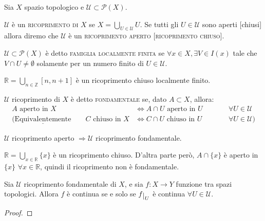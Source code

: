 Sia $X$ spazio topologico e $\mathcal{U} \subset \mathcal{P}(X)$.

\begin{defn}
$\mathcal{U}$ è un \textsc{ricoprimento di $X$} se $X=\bigcup _{U \in \mathcal{U}}U$. Se tutti gli $U \in \mathcal{U}$ sono aperti [chiusi] allora diremo che $\mathcal{U}$ è un \textsc{ricoprimento aperto [ricoprimento chiuso]}.
\end{defn}

\begin{defn}
$\mathcal{U} \subset \mathcal{P}(X)$ è detto \textsc{famiglia localmente finita} se $\forall x \in X, \exists V \in I(x)$ tale che $V \cap U \neq \emptyset$ solamente per un numero finito di $U \in \mathcal{U}$.
\end{defn}

\begin{ex}
$\mathbb{R}=\bigcup _{n \in \mathbb{Z}}[n,n+1]$ è un ricoprimento chiuso localmente finito.
\end{ex}

\begin{defn}
$\mathcal{U}$ ricoprimento di $X$ è detto \textsc{fondamentale} se, dato $A \subset X$, allora:
\begin{align*}
A \text{ aperto in }X &\Longleftrightarrow A \cap U \text{ aperto in }U \qquad &&\forall U \in \mathcal{U} \\
(\underline{\text{Equivalentemente}} \qquad C \text{ chiuso in }X &\Longleftrightarrow C \cap U \text{ chiuso in }U \qquad &&\forall U \in \mathcal{U})
\end{align*}
\end{defn}

\begin{ex}
\begin{nlist}
\item $\mathcal{U}$ ricoprimento aperto $\Longrightarrow \mathcal{U}$ ricoprimento fondamentale.
\item $\mathbb{R}=\bigcup _{x \in \mathbb{R}} \{x\}$ è un ricoprimento chiuso. D'altra parte però, $A \cap \{x\}$ è aperto in $\{x\}$ $\forall x \in \mathbb{R}$, quindi il ricoprimento non è fondamentale.
\end{nlist}
\end{ex}

\begin{prop}
Sia $\mathcal{U}$ ricoprimento fondamentale di $X$, e sia $f:X \longrightarrow Y$ funzione tra spazi topologici. Allora $f$ è continua se e solo se $f \restrict {U}$ è continua $\forall U \in \mathcal{U}$.
\end{prop}
\begin{proof}

\end{proof}

